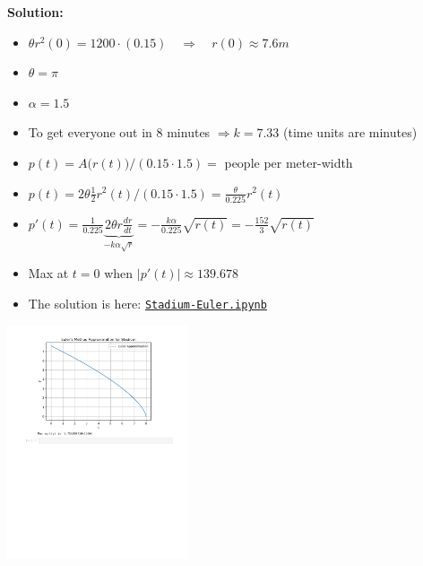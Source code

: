 \begin{solution}
\begin{slide}

\textbf{Solution:}

\begin{itemize}
\item $\theta r^2(0) = 1200 \cdot (0.15) \quad \Rightarrow \quad r(0) \approx 7.6m$
\item $\theta = \pi$
\item $\alpha = 1.5$
\item To get everyone out in 8 minutes $\Rightarrow k = 7.33$ (time units are minutes)
\item $p(t) = A\big(r(t)\big)/(0.15\cdot 1.5) = $ people per meter-width
\item $p(t) = 2\theta \frac12 r^2(t)/(0.15\cdot 1.5) = \frac{\theta}{0.225} r^2(t)$
\item $\displaystyle p'(t) = \frac{1}{0.225} \underbrace{2 \theta r\frac{dr}{dt}}_{- k \alpha \sqrt{r}} = -\frac{k \alpha}{0.225} \sqrt{r(t)} = - \frac{152}{3} \sqrt{r(t)}$ 
\item Max at $t=0$ when $|p'(t)| \approx 139.678$
\item The solution is here: \href{https://utoronto.syzygy.ca/jupyter/user-redirect/git-pull?repo=https://github.com/bigfatbernie/IBLMathModeling&subPath=book/python/Stadium-Euler.ipynb}{\tt Stadium-Euler.ipynb}
\end{itemize}

\includegraphics[width=0.4\textwidth]{python/Stadium-Euler-ipynb.pdf}


\end{slide}	
\end{solution}








